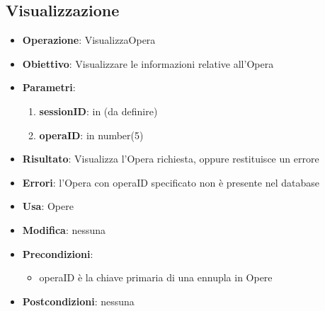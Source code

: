 \documentclass[a4paper,11pt]{article}
\begin{document}
\subsection{Visualizzazione}
\begin{itemize}
	\item \textbf{Operazione}: VisualizzaOpera
	\item \textbf{Obiettivo}: Visualizzare le informazioni relative all'Opera
	\item \textbf{Parametri}:
		\begin{enumerate}
			\item \textbf{sessionID}: in (da definire)
			\item \textbf{operaID}: in number(5)
		\end{enumerate}
	\item \textbf{Risultato}: Visualizza l'Opera richiesta, oppure restituisce un errore
	\item \textbf{Errori}: l'Opera con operaID specificato non è presente nel database
	\item \textbf{Usa}: Opere
	\item \textbf{Modifica}: nessuna
	\item \textbf{Precondizioni}:
		\begin{itemize}
			\item operaID è la chiave primaria di una ennupla in Opere
		\end{itemize}
	\item \textbf{Postcondizioni}: nessuna
\end{itemize}

\end{document}

